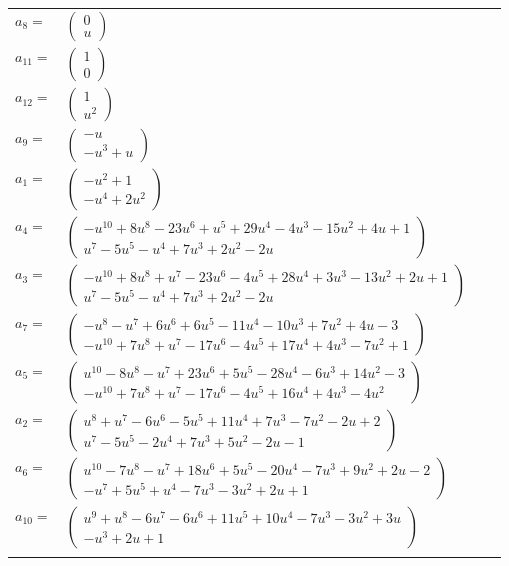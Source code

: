 \documentclass[1p]{elsarticle_modified}
\theoremstyle{definition}
\begin{document}
\begin{tabular}{m{7pt} m{180pt} m{7pt} m{180pt} }
\flushright $a_{8}=$&$\begin{pmatrix}0\\u\end{pmatrix}$ \\
\flushright $a_{11}=$&$\begin{pmatrix}1\\0\end{pmatrix}$ \\
\flushright $a_{12}=$&$\begin{pmatrix}1\\u^2\end{pmatrix}$ \\
\flushright $a_{9}=$&$\begin{pmatrix}- u\\- u^3+u\end{pmatrix}$ \\
\flushright $a_{1}=$&$\begin{pmatrix}- u^2+1\\- u^4+2 u^2\end{pmatrix}$ \\
\flushright $a_{4}=$&$\begin{pmatrix}- u^{10}+8 u^8-23 u^6+u^5+29 u^4-4 u^3-15 u^2+4 u+1\\u^7-5 u^5- u^4+7 u^3+2 u^2-2 u\end{pmatrix}$ \\
\flushright $a_{3}=$&$\begin{pmatrix}- u^{10}+8 u^8+u^7-23 u^6-4 u^5+28 u^4+3 u^3-13 u^2+2 u+1\\u^7-5 u^5- u^4+7 u^3+2 u^2-2 u\end{pmatrix}$ \\
\flushright $a_{7}=$&$\begin{pmatrix}- u^8- u^7+6 u^6+6 u^5-11 u^4-10 u^3+7 u^2+4 u-3\\- u^{10}+7 u^8+u^7-17 u^6-4 u^5+17 u^4+4 u^3-7 u^2+1\end{pmatrix}$ \\
\flushright $a_{5}=$&$\begin{pmatrix}u^{10}-8 u^8- u^7+23 u^6+5 u^5-28 u^4-6 u^3+14 u^2-3\\- u^{10}+7 u^8+u^7-17 u^6-4 u^5+16 u^4+4 u^3-4 u^2\end{pmatrix}$ \\
\flushright $a_{2}=$&$\begin{pmatrix}u^8+u^7-6 u^6-5 u^5+11 u^4+7 u^3-7 u^2-2 u+2\\u^7-5 u^5-2 u^4+7 u^3+5 u^2-2 u-1\end{pmatrix}$ \\
\flushright $a_{6}=$&$\begin{pmatrix}u^{10}-7 u^8- u^7+18 u^6+5 u^5-20 u^4-7 u^3+9 u^2+2 u-2\\- u^7+5 u^5+u^4-7 u^3-3 u^2+2 u+1\end{pmatrix}$ \\
\flushright $a_{10}=$&$\begin{pmatrix}u^9+u^8-6 u^7-6 u^6+11 u^5+10 u^4-7 u^3-3 u^2+3 u\\- u^3+2 u+1\end{pmatrix}$\\&\end{tabular}
\end{document}

